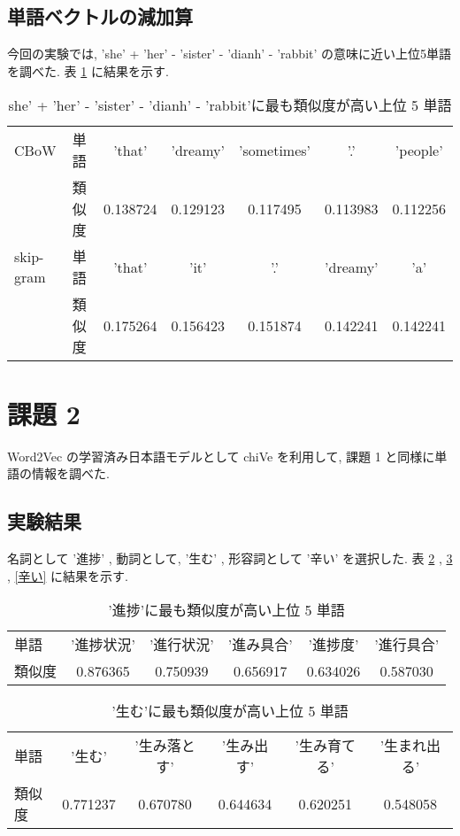 \documentclass{jarticle}     %
\begin{document}
\subsection{単語ベクトルの減加算}
今回の実験では, 'she' + 'her' - 'sister' -  'dianh' - 'rabbit' の意味に近い上位5単語を調べた. 表 \ref{vector} に結果を示す.

\begin{table}[H]
  \caption{she' + 'her' - 'sister' -  'dianh' - 'rabbit'に最も類似度が高い上位 5 単語}
  \label{vector}
  \centering
  \begin{tabular}{llccccc}
    \hline
    CBoW & 単語       & 'that'  & 'dreamy'     & 'sometimes'     & '.'   & 'people'     \\
     & 類似度 &  0.138724 & 0.129123 & 0.117495 & 0.113983 & 0.112256 \\
    \hline
    skip-gram & 単語       & 'that'  & 'it'     & '.'     & 'dreamy'   & 'a'     \\
     & 類似度 &  0.175264 & 0.156423 & 0.151874 & 0.142241 & 0.142241 \\
    \hline
  \end{tabular}
\end{table}

\section{課題 2}
Word2Vec の学習済み日本語モデルとして chiVe を利用して, 課題 1 と同様に単語の情報を調べた.
\subsection{実験結果}
名詞として '進捗' , 動詞として, '生む' , 形容詞として '辛い' を選択した. 表 \ref{進捗} , \ref{生む} , \ref{辛い} に結果を示す.


\begin{table}[H]
  \caption{'進捗'に最も類似度が高い上位 5 単語}
  \label{進捗}
  \centering
  \begin{tabular}{lccccc}
    \hline
    単語       & '進捗状況'  & '進行状況'     & '進み具合'     & '進捗度'   & '進行具合'     \\
    類似度 & 0.876365 & 0.750939 & 0.656917 & 0.634026 & 0.587030 \\
    \hline
  \end{tabular}
\end{table}

\begin{table}[H]
  \caption{'生む'に最も類似度が高い上位 5 単語}
  \label{生む}
  \centering
  \begin{tabular}{lccccc}
    \hline
    単語       & '生む'  & '生み落とす'     & '生み出す'     & '生み育てる'   & '生まれ出る'     \\
    類似度 & 0.771237 & 0.670780 & 0.644634 & 0.620251 & 0.548058 \\
    \hline
  \end{tabular}
\end{table}
\end{document}
